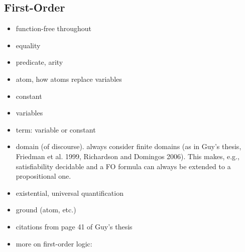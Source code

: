 \subsection{First-Order}

\begin{itemize}
\item function-free throughout
\item equality
\item predicate, arity
\item atom, how atoms replace variables
\item constant
\item variables
\item term: variable or constant
\item domain (of discourse). always consider finite domains (as in Guy's thesis, Friedman et al. 1999, Richardson and Domingos 2006). This makes, e.g., satisfiability decidable and a FO formula can always be extended to a propositional one.
\item existential, universal quantification
\item ground (atom, etc.)
\item citations from page 41 of Guy's thesis
\item more on first-order logic: \citep{DBLP:books/daglib/0023546}
\end{itemize}
